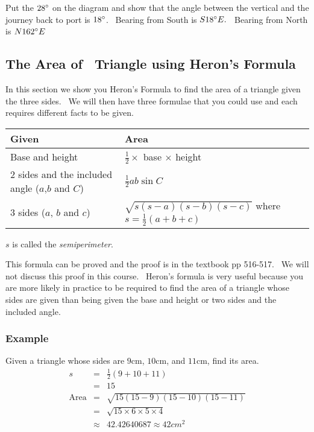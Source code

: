 Put the $28 \mbox{{\ensuremath{{}^\circ}}}$ on the diagram and show that the angle between the vertical and the journey back to port
is $18 \mbox{{\ensuremath{{}^\circ}}}$. \ Bearing from South is $S 18 \mbox{{\ensuremath{{}^\circ}}} E\text{.}$ \ Bearing from North is $N 162 \mbox{{\ensuremath{{}^\circ}}} E$ 

\subsection{The Area of \ Triangle using Heron's Formula}
In this section we show you Heron's Formula to find the area of a triangle given the three sides. \ We
will then have three formulae that you could use and each requires different facts to be given. 


\begin{tabular}[c]{|l|l|}\hline
\textbf{Given}
& \textbf{Area}  \\
\hline
Base and height
& $\frac{1}{2} \times $ base $ \times $ height  \\
\hline
2 sides and the included angle
($a$,$b$ and $C$)  & $\frac{1}{2} a b \sin  C$  \\
\hline
3 sides ($a$, $b$ and $c$)  & $\sqrt{s \left (s -a\right ) \left (s -b\right ) \left (s -c\right )}$ where $s =\frac{1}{2} \left (a +b +c\right )$  \\
\hline
\end{tabular}

$s$ is called the \emph{semiperimeter}. 

This formula can be proved and the proof is in the
textbook pp 516-517. \ We will not discuss this proof in this course. \ Heron's
formula is very useful because you are more likely in practice to be required to find the area of a triangle whose sides are given than being given the
base and height or two sides and the included angle. 

\subsubsection{Example}
Given a triangle whose sides are $9 \mbox{cm}$, $10 \mbox{cm}$, and $11 \mbox{cm}$, find its area.
\begin{align*}s &  = & \frac{1}{2} \left (9 +10 +11\right ) \\
 &  = & 15 \\
\text{Area} &  = & \sqrt{15 (15 -9) (15 -10) (15 -11)} \\
 &  = & \sqrt{15 \times 6 \times 5 \times 4} \\
 &  \approx  & 42.42640687 \approx 42 cm^{2}\end{align*}

